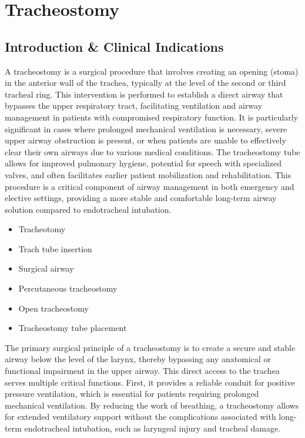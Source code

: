 \chapter{Tracheostomy}

\section*{Introduction \& Clinical Indications}
A tracheostomy is a surgical procedure that involves creating an opening (stoma) in the anterior wall of the trachea, typically at the level of the second or third tracheal ring. This intervention is performed to establish a direct airway that bypasses the upper respiratory tract, facilitating ventilation and airway management in patients with compromised respiratory function. It is particularly significant in cases where prolonged mechanical ventilation is necessary, severe upper airway obstruction is present, or when patients are unable to effectively clear their own airways due to various medical conditions. The tracheostomy tube allows for improved pulmonary hygiene, potential for speech with specialized valves, and often facilitates earlier patient mobilization and rehabilitation. This procedure is a critical component of airway management in both emergency and elective settings, providing a more stable and comfortable long-term airway solution compared to endotracheal intubation.

\begin{itemize}
  \item Tracheotomy
  \item Trach tube insertion
  \item Surgical airway
  \item Percutaneous tracheostomy
  \item Open tracheostomy
  \item Tracheostomy tube placement
\end{itemize}

The primary surgical principle of a tracheostomy is to create a secure and stable airway below the level of the larynx, thereby bypassing any anatomical or functional impairment in the upper airway. This direct access to the trachea serves multiple critical functions. First, it provides a reliable conduit for positive pressure ventilation, which is essential for patients requiring prolonged mechanical ventilation. By reducing the work of breathing, a tracheostomy allows for extended ventilatory support without the complications associated with long-term endotracheal intubation, such as laryngeal injury and tracheal damage.

